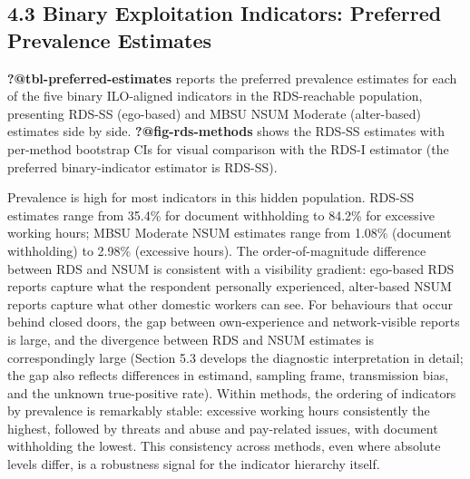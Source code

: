 \documentclass[
  12pt,
  letterpaper,
  DIV=11,
  numbers=noendperiod]{scrartcl}
\begin{document}
\subsection{4.3 Binary Exploitation Indicators: Preferred Prevalence
Estimates}\label{binary-exploitation-indicators-preferred-prevalence-estimates}

\textbf{?@tbl-preferred-estimates} reports the preferred prevalence
estimates for each of the five binary ILO-aligned indicators in the
RDS-reachable population, presenting RDS-SS (ego-based) and MBSU NSUM
Moderate (alter-based) estimates side by side.
\textbf{?@fig-rds-methods} shows the RDS-SS estimates with per-method
bootstrap CIs for visual comparison with the RDS-I estimator (the
preferred binary-indicator estimator is RDS-SS).

Prevalence is high for most indicators in this hidden population. RDS-SS
estimates range from 35.4\% for document withholding to 84.2\% for
excessive working hours; MBSU Moderate NSUM estimates range from 1.08\%
(document withholding) to 2.98\% (excessive hours). The
order-of-magnitude difference between RDS and NSUM is consistent with a
visibility gradient: ego-based RDS reports capture what the respondent
personally experienced, alter-based NSUM reports capture what other
domestic workers can see. For behaviours that occur behind closed doors,
the gap between own-experience and network-visible reports is large, and
the divergence between RDS and NSUM estimates is correspondingly large
(Section 5.3 develops the diagnostic interpretation in detail; the gap
also reflects differences in estimand, sampling frame, transmission
bias, and the unknown true-positive rate). Within methods, the ordering
of indicators by prevalence is remarkably stable: excessive working
hours consistently the highest, followed by threats and abuse and
pay-related issues, with document withholding the lowest. This
consistency across methods, even where absolute levels differ, is a
robustness signal for the indicator hierarchy itself.
\end{document}
